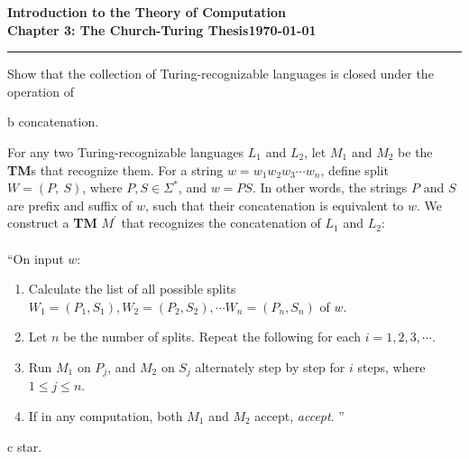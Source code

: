 \documentclass[11pt]{article}
\newcommand{\dated}{\today}
\begin{document}
\textbf{Introduction to the Theory of
Computation}\hfill\textbf{\myname}\\[0.01in]
\textbf{Chapter 3: The Church-Turing Thesis}\hfill\textbf{\dated}\\
\smallskip\hrule\bigskip

\begin{problem}{3.16}
Show that the collection of Turing-recognizable languages is closed under the operation of
\end{problem}

\begin{problem}[Part]{b}
concatenation.
\end{problem}

For any two Turing-recognizable languages $L_1$ and $L_2$, let $M_1$ and $M_2$ be the \textbf{TM}s that recognize them. For a string $w = w_1w_2w_3 \cdots w_n$, define split $W = (P, \ S)$, where $P, S \in \Sigma^*$, and $w = PS$. In other words, the strings $P$ and $S$ are prefix and suffix of $w$, such that their concatenation is equivalent to $w$. We construct a \textbf{TM} $M^{'}$ that recognizes the concatenation of $L_1$ and $L_2$: \\
\\
\textquotedblleft On input $w$:
\begin{enumerate}
\item Calculate the list of all possible splits $W_1 = (P_1, S_1), W_2 = (P_2, S_2), \cdots W_n = (P_n, S_n)$ of $w$.
\item Let $n$ be the number of splits. Repeat the following for each $i = 1, 2, 3, \cdots$.
\item \hspace*{0.5cm} Run $M_1$ on $P_j$, and $M_2$ on $S_j$ alternately step by step for $i$ steps, where $1 \leq j \leq n$.
\item \hspace*{0.5cm} If in any computation, both $M_1$ and $M_2$ accept, \textit{accept}. \textquotedblright
\end{enumerate}

\begin{problem}[Part]{c}
star.
\end{problem}
\end{document}
